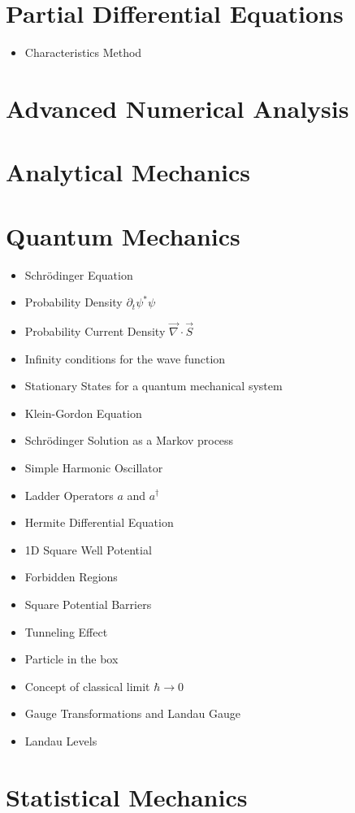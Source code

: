 \documentclass[10pt]{article}
\begin{document}
\section{Partial Differential Equations}
\begin{itemize}
	\item Characteristics Method
\end{itemize}
\section{Advanced Numerical Analysis}
\section{Analytical Mechanics}
\section{Quantum Mechanics}
\begin{itemize}
	\item Schr\"odinger Equation
	\item Probability Density $\partial_t \psi^*\psi$
	\item Probability Current Density $\vec{\nabla}\cdot\vec{S}$
	\item Infinity conditions for the wave function
	\item Stationary States for a quantum mechanical system
	\item Klein-Gordon Equation
	\item Schr\"odinger Solution as a Markov process
	\item Simple Harmonic Oscillator
	\item Ladder Operators $a$ and $a^{\dag}$
	\item Hermite Differential Equation
	\item 1D Square Well Potential
	\item Forbidden Regions
	\item Square Potential Barriers
	\item Tunneling Effect
	\item Particle in the box
	\item Concept of classical limit $\hbar \to 0$
	\item Gauge Transformations and Landau Gauge
	\item Landau Levels
	\end{itemize}
\section{Statistical Mechanics}
\end{document}
